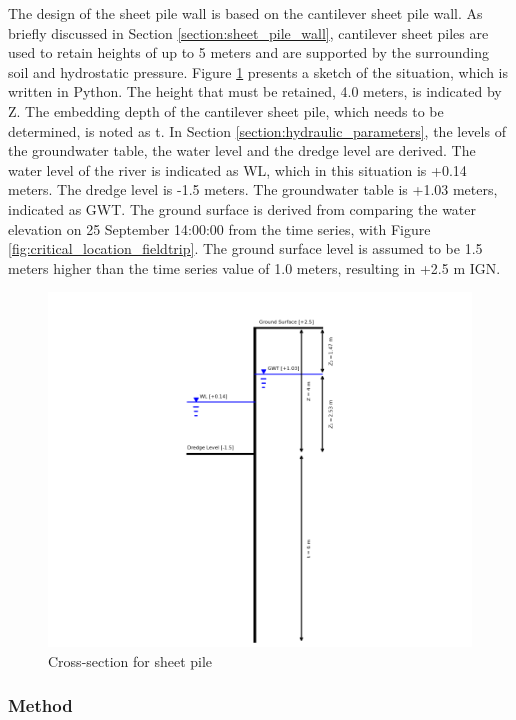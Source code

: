 The design of the sheet pile wall is based on the cantilever sheet pile wall. As briefly discussed in Section \ref{section:sheet_pile_wall}, cantilever sheet piles are used to retain heights of up to 5 meters and are supported by the surrounding soil and hydrostatic pressure. Figure \ref{fig:problem_description_sheetpiles} presents a sketch of the situation, which is written in Python. The height that must be retained, 4.0 meters, is indicated by Z. The embedding depth of the cantilever sheet pile, which needs to be determined, is noted as t. In  Section \ref{section:hydraulic_parameters}, the levels of the groundwater table, the water level and the dredge level are derived. The water level of the river is indicated as WL, which in this situation is +0.14 meters. The dredge level is -1.5 meters. The groundwater table is +1.03 meters, indicated as GWT. The ground surface is derived from comparing the water elevation on 25 September 14:00:00 from the time series, with Figure \ref{fig:critical_location_fieldtrip}. The ground surface level is assumed to be 1.5 meters higher than the time series value of 1.0 meters, resulting in +2.5 m IGN.

\begin{figure}[H]
    \centering
    \includegraphics[width=0.90\linewidth]{figures/ch8/cross_section.png}
    \caption{Cross-section for sheet pile}
    \label{fig:problem_description_sheetpiles}
\end{figure}

\subsubsection{Method}

